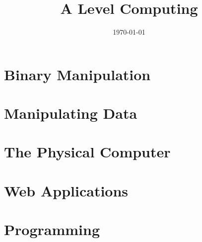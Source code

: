 \documentclass[a4paper,12pt]{book}
\begin{document}
\title{A Level Computing}
\date{\today}

\newcommand\bonus{\textcolor{Black!80}{\textbf{BONUS: }}}
\newcommand\bigo[1]{\mathcal{O}(#1)}
\newcommand\bigO[1]{$\bigo{#1}$}
\newcommand{\true}{\texttt{true} }
\newcommand{\false}{\texttt{false} }
\newcommand{\code}[2][c]{\texttt{#2}}
\newcommand{\RTL}[1]{\texttt{#1}}
\newcommand{\ARM}[1]{\texttt{#1}}
\newcommand{\LMC}[1]{\texttt{#1}}

\renewcommand{\listingscaption}{Snippet}
\maketitle
\frontmatter
\tableofcontents

\mainmatter

\part{Binary Manipulation}
		
	

\part{Manipulating Data}
	
	
	
	
	
	

\part{The Physical Computer}
	
	
	

\part{Web Applications}
	
	
	

\part{Programming}
	
	
	
	
	
	
	
\appendix
\end{document}
